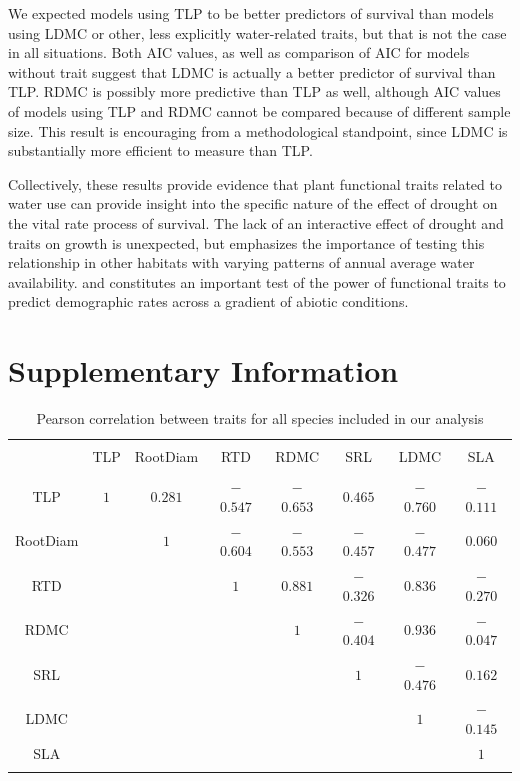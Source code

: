 \documentclass[12pt, letterpaper]{article}
\begin{document}
We expected models using TLP to be better predictors of survival than models using LDMC or other, less explicitly water-related traits, but that is not the case in all situations. Both AIC values, as well as comparison of AIC for models without trait suggest that LDMC is actually a better predictor of survival than TLP. RDMC is possibly more predictive than TLP as well, although AIC values of models using TLP and RDMC cannot be compared because of different sample size. This result is encouraging from a methodological standpoint, since LDMC is substantially more efficient to measure than TLP. 

Collectively, these results provide evidence that plant functional traits related to water use can provide insight into the specific nature of the effect of drought on the vital rate process of survival. The lack of an interactive effect of drought and traits on growth is unexpected, but emphasizes the importance of testing this relationship in other habitats with varying patterns of annual average water availability. and constitutes an important test of the power of functional traits to predict demographic rates across a gradient of abiotic conditions.





\section{Supplementary Information}

\begin{table}[h] \centering 
  \caption{Pearson correlation between traits for all species included in our analysis} 
  \label{allSppCorr}
\begin{tabular} {cccccccc} 
\\[-1.8ex]\hline 
\hline \\[-1.8ex] 
 & TLP & RootDiam & RTD & RDMC & SRL & LDMC & SLA \\ 
\hline \\[-1.8ex] 
\rowcolor[gray]{.95}TLP & $1$ & $0.281$ & $-$ $0.547$ & $-$ $0.653$ & $0.465$ & $-$ $0.760$ & $-$ $0.111$ \\ 
RootDiam &  & $1$ & $-$ $0.604$ & $-$ $0.553$ & $-$ $0.457$ & $-$ $0.477$ & $0.060$ \\ 
\rowcolor[gray]{.95}RTD& &  & $1$ & $0.881$ & $-$ $0.326$ & $0.836$ & $-$ $0.270$ \\ 
RDMC& & &  & $1$ & $-$ $0.404$ & $0.936$ & $-$ $0.047$ \\ 
\rowcolor[gray]{.95}SRL &  & &  & & $1$ & $-$ $0.476$ & $0.162$ \\ 
LDMC & &  & &  &  & $1$ & $-$ $0.145$ \\ 
\rowcolor[gray]{.95}SLA &  & & & & & & $1$ \\ 
\hline \\[-1.8ex] 
\end{tabular} 
\end{table}
\end{document}
